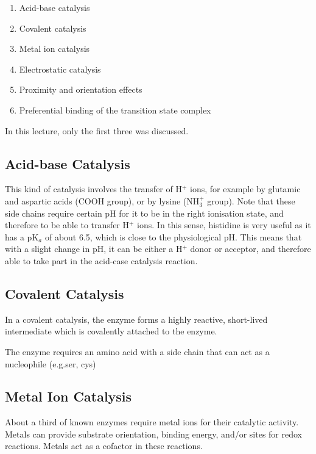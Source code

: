 \begin{enumerate}
\item Acid-base catalysis
\item Covalent catalysis
\item Metal ion catalysis
\item Electrostatic catalysis
\item Proximity and orientation effects
\item Preferential binding of the transition state complex
\end{enumerate}

In this lecture, only the first three was discussed.

\subsection{Acid-base Catalysis}

This kind of catalysis involves the transfer of H$^+$ ions, for example by glutamic and aspartic acids (COOH group), or by lysine (NH$_3^+$ group).
Note that these side chains require certain pH for it to be in the right ionisation state, and therefore to be able to transfer H$^+$ ions.
In this sense, histidine is very useful as it has a pK$_a$ of about 6.5, which is close to the physiological pH.
This means that with a slight change in pH, it can be either a H$^+$ donor or acceptor, and therefore able to take part in the acid-case catalysis reaction.

\subsection{Covalent Catalysis}

In a covalent catalysis, the enzyme forms a highly reactive, short-lived intermediate which is covalently attached to the enzyme.

\begin{center}
\end{center}

The enzyme requires an amino acid with a side chain that can act as a nucleophile (e.g.ser, cys)

\subsection{Metal Ion Catalysis}

About a third of known enzymes require metal ions for their catalytic activity.
Metals can provide substrate orientation, binding energy, and/or sites for redox reactions.
Metals act as a cofactor in these reactions.

